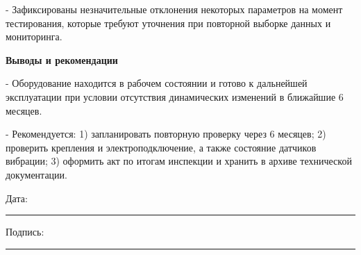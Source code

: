 \documentclass[12pt]{article}
\begin{document}
- Зафиксированы незначительные отклонения некоторых параметров на момент тестирования, которые требуют уточнения при повторной выборке данных и мониторинга.

\textbf{Выводы и рекомендации}

- Оборудование находится в рабочем состоянии и готово к дальнейшей эксплуатации при условии отсутствия динамических изменений в ближайшие 6 месяцев.

- Рекомендуется: 1) запланировать повторную проверку через 6 месяцев; 2) проверить крепления и электроподключение, а также состояние датчиков вибрации; 3) оформить акт по итогам инспекции и хранить в архиве технической документации.

\vfill

\noindent
Дата: \rule{5cm}{0.4pt} \hfill Подпись: \rule{5cm}{0.4pt}
\end{document}

